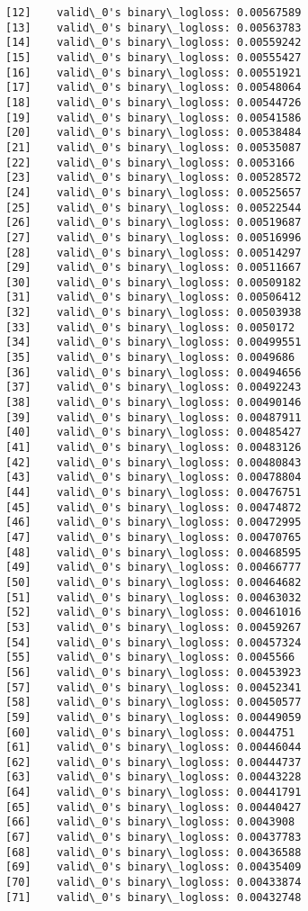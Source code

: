 \documentclass[11pt]{article}
\begin{document}
\begin{Verbatim}[commandchars=\\\{\}]
[12]	valid\_0's binary\_logloss: 0.00567589
[13]	valid\_0's binary\_logloss: 0.00563783
[14]	valid\_0's binary\_logloss: 0.00559242
[15]	valid\_0's binary\_logloss: 0.00555427
[16]	valid\_0's binary\_logloss: 0.00551921
[17]	valid\_0's binary\_logloss: 0.00548064
[18]	valid\_0's binary\_logloss: 0.00544726
[19]	valid\_0's binary\_logloss: 0.00541586
[20]	valid\_0's binary\_logloss: 0.00538484
[21]	valid\_0's binary\_logloss: 0.00535087
[22]	valid\_0's binary\_logloss: 0.0053166
[23]	valid\_0's binary\_logloss: 0.00528572
[24]	valid\_0's binary\_logloss: 0.00525657
[25]	valid\_0's binary\_logloss: 0.00522544
[26]	valid\_0's binary\_logloss: 0.00519687
[27]	valid\_0's binary\_logloss: 0.00516996
[28]	valid\_0's binary\_logloss: 0.00514297
[29]	valid\_0's binary\_logloss: 0.00511667
[30]	valid\_0's binary\_logloss: 0.00509182
[31]	valid\_0's binary\_logloss: 0.00506412
[32]	valid\_0's binary\_logloss: 0.00503938
[33]	valid\_0's binary\_logloss: 0.0050172
[34]	valid\_0's binary\_logloss: 0.00499551
[35]	valid\_0's binary\_logloss: 0.0049686
[36]	valid\_0's binary\_logloss: 0.00494656
[37]	valid\_0's binary\_logloss: 0.00492243
[38]	valid\_0's binary\_logloss: 0.00490146
[39]	valid\_0's binary\_logloss: 0.00487911
[40]	valid\_0's binary\_logloss: 0.00485427
[41]	valid\_0's binary\_logloss: 0.00483126
[42]	valid\_0's binary\_logloss: 0.00480843
[43]	valid\_0's binary\_logloss: 0.00478804
[44]	valid\_0's binary\_logloss: 0.00476751
[45]	valid\_0's binary\_logloss: 0.00474872
[46]	valid\_0's binary\_logloss: 0.00472995
[47]	valid\_0's binary\_logloss: 0.00470765
[48]	valid\_0's binary\_logloss: 0.00468595
[49]	valid\_0's binary\_logloss: 0.00466777
[50]	valid\_0's binary\_logloss: 0.00464682
[51]	valid\_0's binary\_logloss: 0.00463032
[52]	valid\_0's binary\_logloss: 0.00461016
[53]	valid\_0's binary\_logloss: 0.00459267
[54]	valid\_0's binary\_logloss: 0.00457324
[55]	valid\_0's binary\_logloss: 0.0045566
[56]	valid\_0's binary\_logloss: 0.00453923
[57]	valid\_0's binary\_logloss: 0.00452341
[58]	valid\_0's binary\_logloss: 0.00450577
[59]	valid\_0's binary\_logloss: 0.00449059
[60]	valid\_0's binary\_logloss: 0.0044751
[61]	valid\_0's binary\_logloss: 0.00446044
[62]	valid\_0's binary\_logloss: 0.00444737
[63]	valid\_0's binary\_logloss: 0.00443228
[64]	valid\_0's binary\_logloss: 0.00441791
[65]	valid\_0's binary\_logloss: 0.00440427
[66]	valid\_0's binary\_logloss: 0.0043908
[67]	valid\_0's binary\_logloss: 0.00437783
[68]	valid\_0's binary\_logloss: 0.00436588
[69]	valid\_0's binary\_logloss: 0.00435409
[70]	valid\_0's binary\_logloss: 0.00433874
[71]	valid\_0's binary\_logloss: 0.00432748

\end{Verbatim}
\end{document}
